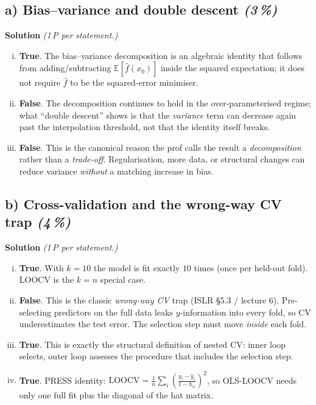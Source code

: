 \documentclass[11pt,a4paper]{article}
\newcommand{\subpoints}[1]{\textit{(#1\,\%)}}
\newcommand{\sol}{\noindent\textbf{Solution}}
\begin{document}
\subsection*{a) Bias--variance and double descent \subpoints{3}}
\sol{} \emph{(1\,P per statement.)}
\begin{enumerate}[(i)]
  \item \textbf{True}. The bias--variance decomposition is an algebraic identity that follows from
        adding/subtracting $\mathbb{E}[\hat f(x_0)]$ inside the squared expectation; it does not
        require $\hat f$ to be the squared-error minimiser.
  \item \textbf{False}. The decomposition continues to hold in the over-parameterised regime; what
        ``double descent'' shows is that the \emph{variance} term can decrease again past the
        interpolation threshold, not that the identity itself breaks.
  \item \textbf{False}. This is the canonical reason the prof calls the result a \emph{decomposition}
        rather than a \emph{trade-off}. Regularisation, more data, or structural changes can reduce
        variance \emph{without} a matching increase in bias.
\end{enumerate}

\subsection*{b) Cross-validation and the wrong-way CV trap \subpoints{4}}
\sol{} \emph{(1\,P per statement.)}
\begin{enumerate}[(i)]
  \item \textbf{True}. With $k=10$ the model is fit exactly $10$ times (once per held-out fold). LOOCV
        is the $k=n$ special case.
  \item \textbf{False}. This is the classic \emph{wrong-way CV} trap (ISLR \S5.3 / lecture 6).
        Pre-selecting predictors on the full data leaks $y$-information into every fold, so CV
        underestimates the test error. The selection step must move \emph{inside} each fold.
  \item \textbf{True}. This is exactly the structural definition of nested CV: inner loop selects,
        outer loop assesses the procedure that includes the selection step.
  \item \textbf{True}. PRESS identity: $\mathrm{LOOCV} = \frac{1}{n}\sum_i\!\left(\frac{y_i-\hat y_i}{1-h_{ii}}\right)^2$,
        so OLS-LOOCV needs only one full fit plus the diagonal of the hat matrix.
\end{enumerate}
\end{document}
